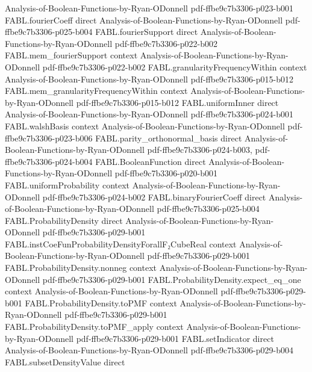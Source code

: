 \begin{theorem}
  {Analysis-of-Boolean-Functions-by-Ryan-ODonnell}
  {pdf-ffbe9c7b3306-p023-b001}
\proofstep
  {FABL.fourierCoeff}
  {direct}
  {Analysis-of-Boolean-Functions-by-Ryan-ODonnell}
  {pdf-ffbe9c7b3306-p025-b004}
\proofstep
  {FABL.fourierSupport}
  {direct}
  {Analysis-of-Boolean-Functions-by-Ryan-ODonnell}
  {pdf-ffbe9c7b3306-p022-b002}
\proofstep
  {FABL.mem_fourierSupport}
  {context}
  {Analysis-of-Boolean-Functions-by-Ryan-ODonnell}
  {pdf-ffbe9c7b3306-p022-b002}
\proofstep
  {FABL.granularityFrequencyWithin}
  {context}
  {Analysis-of-Boolean-Functions-by-Ryan-ODonnell}
  {pdf-ffbe9c7b3306-p015-b012}
\proofstep
  {FABL.mem_granularityFrequencyWithin}
  {context}
  {Analysis-of-Boolean-Functions-by-Ryan-ODonnell}
  {pdf-ffbe9c7b3306-p015-b012}
\proofstep
  {FABL.uniformInner}
  {direct}
  {Analysis-of-Boolean-Functions-by-Ryan-ODonnell}
  {pdf-ffbe9c7b3306-p024-b001}
\proofstep
  {FABL.walshBasis}
  {context}
  {Analysis-of-Boolean-Functions-by-Ryan-ODonnell}
  {pdf-ffbe9c7b3306-p023-b006}
\proofstep
  {FABL.parity_orthonormal_basis}
  {direct}
  {Analysis-of-Boolean-Functions-by-Ryan-ODonnell}
  {pdf-ffbe9c7b3306-p024-b003,
    pdf-ffbe9c7b3306-p024-b004}
\proofstep
  {FABL.BooleanFunction}
  {direct}
  {Analysis-of-Boolean-Functions-by-Ryan-ODonnell}
  {pdf-ffbe9c7b3306-p020-b001}
\proofstep
  {FABL.uniformProbability}
  {context}
  {Analysis-of-Boolean-Functions-by-Ryan-ODonnell}
  {pdf-ffbe9c7b3306-p024-b002}
\proofstep
  {FABL.binaryFourierCoeff}
  {direct}
  {Analysis-of-Boolean-Functions-by-Ryan-ODonnell}
  {pdf-ffbe9c7b3306-p025-b004}
\proofstep
  {FABL.ProbabilityDensity}
  {direct}
  {Analysis-of-Boolean-Functions-by-Ryan-ODonnell}
  {pdf-ffbe9c7b3306-p029-b001}
\proofstep
  {FABL.instCoeFunProbabilityDensityForallF₂CubeReal}
  {context}
  {Analysis-of-Boolean-Functions-by-Ryan-ODonnell}
  {pdf-ffbe9c7b3306-p029-b001}
\proofstep
  {FABL.ProbabilityDensity.nonneg}
  {context}
  {Analysis-of-Boolean-Functions-by-Ryan-ODonnell}
  {pdf-ffbe9c7b3306-p029-b001}
\proofstep
  {FABL.ProbabilityDensity.expect_eq_one}
  {context}
  {Analysis-of-Boolean-Functions-by-Ryan-ODonnell}
  {pdf-ffbe9c7b3306-p029-b001}
\proofstep
  {FABL.ProbabilityDensity.toPMF}
  {context}
  {Analysis-of-Boolean-Functions-by-Ryan-ODonnell}
  {pdf-ffbe9c7b3306-p029-b001}
\proofstep
  {FABL.ProbabilityDensity.toPMF_apply}
  {context}
  {Analysis-of-Boolean-Functions-by-Ryan-ODonnell}
  {pdf-ffbe9c7b3306-p029-b001}
\proofstep
  {FABL.setIndicator}
  {direct}
  {Analysis-of-Boolean-Functions-by-Ryan-ODonnell}
  {pdf-ffbe9c7b3306-p029-b004}
\proofstep
  {FABL.subsetDensityValue}
  {direct}

\end{theorem}
